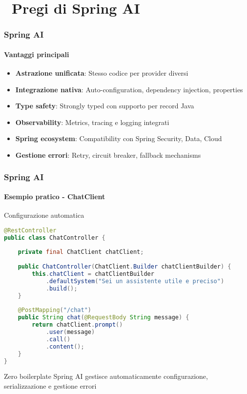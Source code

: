 \section{\faThumbsUp\ Pregi di Spring AI} %
\label{sec:spring-ai-pros}

\begin{frame}[t] \frametitle{Spring AI}
    \framesubtitle{Vantaggi principali}
    \begin{itemize}[leftmargin=10pt,align=right]
        \item[\alert{\faCheckCircle}] \textbf{Astrazione unificata}: Stesso codice per provider diversi
        \item[\alert{\faCheckCircle}] \textbf{Integrazione nativa}: Auto-configuration, dependency injection, properties
        \item[\alert{\faCheckCircle}] \textbf{Type safety}: Strongly typed con supporto per record Java
        \item[\alert{\faCheckCircle}] \textbf{Observability}: Metrics, tracing e logging integrati
        \item[\alert{\faCheckCircle}] \textbf{Spring ecosystem}: Compatibility con Spring Security, Data, Cloud
        \item[\alert{\faCheckCircle}] \textbf{Gestione errori}: Retry, circuit breaker, fallback mechanisms
    \end{itemize}
\end{frame}

\begin{frame}[t,fragile] \frametitle{Spring AI}
    \framesubtitle{Esempio pratico - ChatClient}
    \begin{block}{Configurazione automatica}
    \begin{lstlisting}[language=java, basicstyle=\tiny\ttfamily]
@RestController
public class ChatController {
    
    private final ChatClient chatClient;
    
    public ChatController(ChatClient.Builder chatClientBuilder) {
        this.chatClient = chatClientBuilder
            .defaultSystem("Sei un assistente utile e preciso")
            .build();
    }
    
    @PostMapping("/chat")
    public String chat(@RequestBody String message) {
        return chatClient.prompt()
            .user(message)
            .call()
            .content();
    }
}
    \end{lstlisting}
    \end{block}
    
    \begin{alertblock}{Zero boilerplate}
        Spring AI gestisce automaticamente configurazione, serializzazione e gestione errori
    \end{alertblock}
\end{frame}

